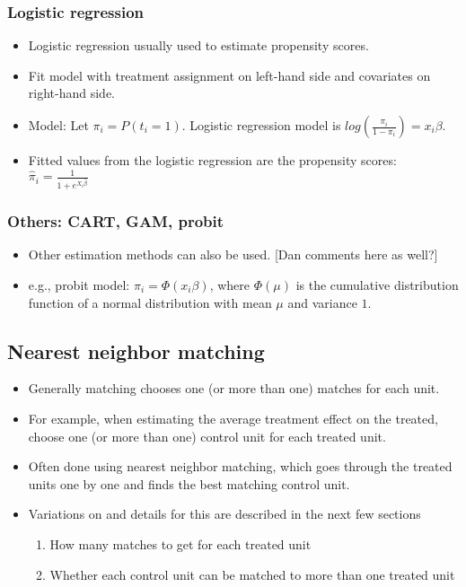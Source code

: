 \documentclass[11pt,titlepage]{article}
\begin{document}
\subsubsection{Logistic regression}
\begin{itemize}
\item Logistic regression usually used to estimate propensity scores.
\item Fit model with treatment assignment on left-hand side and
  covariates on right-hand side.
\item Model: Let $\pi_i=P(t_i=1)$.  Logistic regression model is
  $log(\frac{\pi_i}{1-\pi_i}) = x_i \beta$.
\item Fitted values from the logistic regression are the propensity
  scores: $\hat{\pi}_i = \frac{1}{1+e^{X_i \hat{\beta}}}$
\end{itemize}

\subsubsection{Others: CART, GAM, probit}
\begin{itemize}
\item Other estimation methods can also be used.  [Dan comments here
  as well?]
\item e.g., probit model: $\pi_i = \Phi(x_i \beta)$, where $\Phi(\mu)$
  is the cumulative distribution function of a normal distribution
  with mean $\mu$ and variance $1$.
\end{itemize}

\subsection{Nearest neighbor matching}
\label{nearest}
\begin{itemize}
\item Generally matching chooses one (or more than one) matches for
  each unit.
\item For example, when estimating the average treatment effect on the
  treated, choose one (or more than one) control unit for each treated
  unit.
\item Often done using nearest neighbor matching, which goes through
  the treated units one by one and finds the best matching control
  unit.
\item Variations on and details for this are described in the next few
  sections
\begin{enumerate} \item  How many matches to get for each treated unit
\item Whether each control unit can be matched to more than one
  treated unit
\end{enumerate}
\end{itemize}
\end{document}
